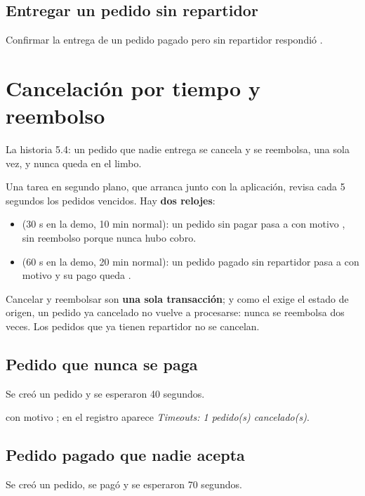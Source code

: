 \documentclass[11pt]{article}
\begin{document}
\subsection{Entregar un pedido sin repartidor}
Confirmar la entrega de un pedido pagado pero sin repartidor respondió .

\section{Cancelación por tiempo y reembolso}\label{sec:timeouts}

\queria La historia 5.4: un pedido que nadie entrega se cancela y se reembolsa, una sola vez, y nunca
queda en el limbo.

\comofunciona Una tarea en segundo plano, que arranca junto con la aplicación, revisa cada 5 segundos
los pedidos vencidos. Hay \textbf{dos relojes}:

\begin{itemize}
  \item {} (30 s en la demo, 10 min normal): un pedido sin pagar pasa a
         con motivo , sin reembolso porque nunca hubo cobro.
  \item {} (60 s en la demo, 20 min normal): un pedido pagado sin
        repartidor pasa a  con motivo  y su pago queda
        .
\end{itemize}

Cancelar y reembolsar son \textbf{una sola transacción}; y como el  exige el estado de
origen, un pedido ya cancelado no vuelve a procesarse: nunca se reembolsa dos veces. Los pedidos que
ya tienen repartidor no se cancelan.

\subsection{Pedido que nunca se paga}
Se creó un pedido y se esperaron 40 segundos.

\observado {} con motivo ; en el registro aparece
\emph{Timeouts: 1 pedido(s) cancelado(s)}.

\subsection{Pedido pagado que nadie acepta}
Se creó un pedido, se pagó y se esperaron 70 segundos.
\end{document}
